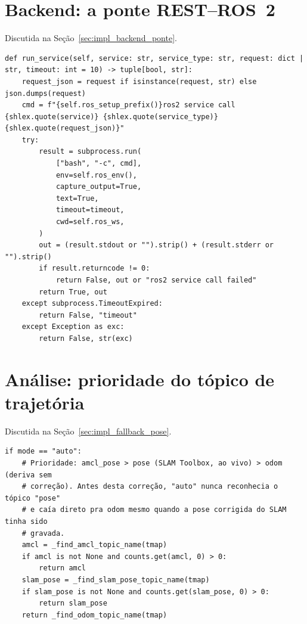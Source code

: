 \section{Backend: a ponte REST--ROS~2}

Discutida na Seção~\ref{sec:impl_backend_ponte}.

\begin{lstlisting}[style=pycode, caption={Método \texttt{RosBridge.\allowbreak run\_\allowbreak service}, usado por \texttt{\_\allowbreak run\_\allowbreak ros2\_\allowbreak service} e por todos os endpoints \texttt{/\allowbreak api/\allowbreak *} que encaminham comandos ao orquestrador (\texttt{backend/\allowbreak ros\_\allowbreak bridge.py}).}, label={lst:backend_bridge}]
def run_service(self, service: str, service_type: str, request: dict | str, timeout: int = 10) -> tuple[bool, str]:
    request_json = request if isinstance(request, str) else json.dumps(request)
    cmd = f"{self.ros_setup_prefix()}ros2 service call {shlex.quote(service)} {shlex.quote(service_type)} {shlex.quote(request_json)}"
    try:
        result = subprocess.run(
            ["bash", "-c", cmd],
            env=self.ros_env(),
            capture_output=True,
            text=True,
            timeout=timeout,
            cwd=self.ros_ws,
        )
        out = (result.stdout or "").strip() + (result.stderr or "").strip()
        if result.returncode != 0:
            return False, out or "ros2 service call failed"
        return True, out
    except subprocess.TimeoutExpired:
        return False, "timeout"
    except Exception as exc:
        return False, str(exc)
\end{lstlisting}

\section{Análise: prioridade do tópico de trajetória}

Discutida na Seção~\ref{sec:impl_fallback_pose}.

\begin{lstlisting}[style=pycode, caption={Prioridade do modo \texttt{auto} em \texttt{\_\allowbreak resolve\_\allowbreak trajectory\_\allowbreak topic} (\texttt{fleet\_\allowbreak ws/\allowbreak scripts/\allowbreak analyze\_\allowbreak runs.py}).}, label={lst:pose_fallback}]
if mode == "auto":
    # Prioridade: amcl_pose > pose (SLAM Toolbox, ao vivo) > odom (deriva sem
    # correção). Antes desta correção, "auto" nunca reconhecia o tópico "pose"
    # e caía direto pra odom mesmo quando a pose corrigida do SLAM tinha sido
    # gravada.
    amcl = _find_amcl_topic_name(tmap)
    if amcl is not None and counts.get(amcl, 0) > 0:
        return amcl
    slam_pose = _find_slam_pose_topic_name(tmap)
    if slam_pose is not None and counts.get(slam_pose, 0) > 0:
        return slam_pose
    return _find_odom_topic_name(tmap)
\end{lstlisting}

